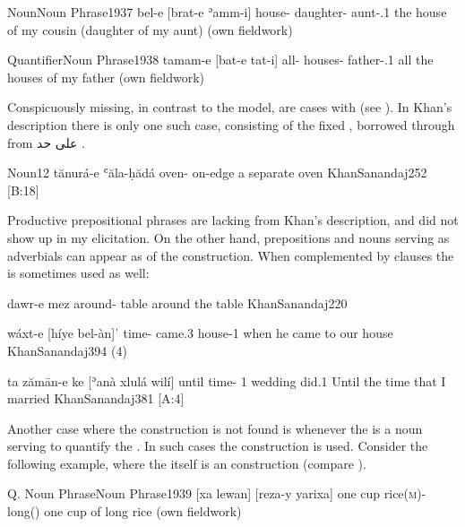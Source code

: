 \acex
{Noun}{Noun Phrase}{1937}
{bel-e [brat-e ʾamm-i]}
{house-\ez{} daughter-\ez{} aunt-\poss.1\sg}
{the house of my cousin (daughter of my aunt)\footnotemark}
{}{(own fieldwork)}


\acex
{Quantifier}{Noun Phrase}{1938}
{tamam-e [bat-e tat-i]}
{all-\ez{} houses-\ez{} father-\poss.1\sg}
{all the houses of my father}
{}{(own fieldwork)}

Conspicuously missing, in contrast to the \Per model, are cases with  \secns (see ).  In Khan's description there is only one such case, consisting of the fixed  , borrowed through \Per from \Arab \textarabic{على حد}  \citep[569]{KhanSanandaj}.

\acex
{Noun}{\PP}{12}
{tănurá-e ʿăla-ḥădá}
{oven-\ez{} on-edge}
{a separate oven}
{KhanSanandaj}{252 {[B:18]}} 

 
Productive prepositional phrases are lacking from Khan's description, and did not show up in my elicitation. On the other hand, prepositions and nouns serving as adverbials  can appear as \prims of the \ez* construction. When complemented by clauses  the   is sometimes used as well:

{dawr-e mez}
{around-\ez{} table}
{around the table}
{KhanSanandaj}{220}

{wáxt-e [híye bel-àn]ˈ}
{time-\ez{} came.3\masc{} house-1\pl}
{when he came to our house}
{KhanSanandaj}{394 (4)}

{ta\cb{} zămān-e ke\cb{} [ʾanà xlulá wilí]}
{until\cb{} time-\ez{} \rel\cb{} 1\sg{} wedding did.1\sg}
{Until the time that I married}
{KhanSanandaj}{381 {[A:4]}}

Another case where the \ez* construction is not found is whenever the \prim is a noun serving to quantify the \secn. In such cases the  construction is used. Consider the following example, where the \secn itself is an \ez* construction (compare ).

\acex
{Q. Noun Phrase}{Noun Phrase}{1939}
{[xa lewan] [reza-y yarixa]}
{one cup rice(\textsc{m})-\ez{} long(\masc)}
{one cup of long rice}
{}{(own fieldwork)}\antipar



